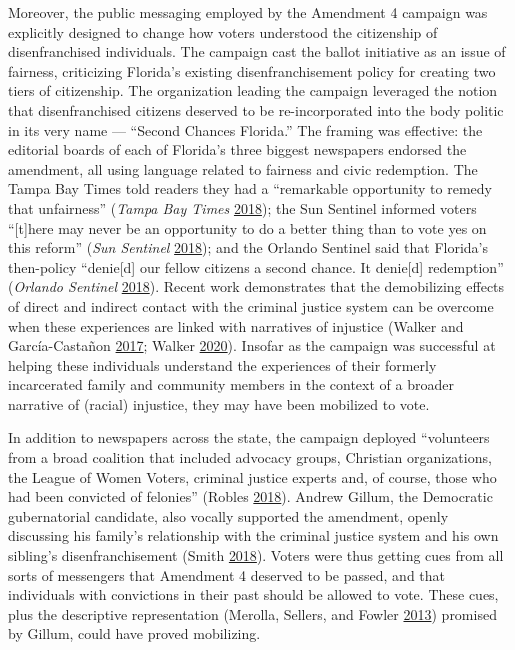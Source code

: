 \documentclass[
  12pt,
]{article}
\begin{document}
Moreover, the public messaging employed by the Amendment 4 campaign was explicitly designed to change how voters understood the citizenship of disenfranchised individuals. The campaign cast the ballot initiative as an issue of fairness, criticizing Florida's existing disenfranchisement policy for creating two tiers of citizenship. The organization leading the campaign leveraged the notion that disenfranchised citizens deserved to be re-incorporated into the body politic in its very name --- ``Second Chances Florida.'' The framing was effective: the editorial boards of each of Florida's three biggest newspapers endorsed the amendment, all using language related to fairness and civic redemption. The Tampa Bay Times told readers they had a ``remarkable opportunity to remedy that unfairness'' (\emph{Tampa Bay Times} \protect\hyperlink{ref-tampabaytimes2018}{2018}); the Sun Sentinel informed voters ``{[}t{]}here may never be an opportunity to do a better thing than to vote yes on this reform'' (\emph{Sun Sentinel} \protect\hyperlink{ref-SunSentinelEditorial2018}{2018}); and the Orlando Sentinel said that Florida's then-policy ``denie{[}d{]} our fellow citizens a second chance. It denie{[}d{]} redemption'' (\emph{Orlando Sentinel} \protect\hyperlink{ref-ORLANDOSENTINEL2018}{2018}). Recent work demonstrates that the demobilizing effects of direct and indirect contact with the criminal justice system can be overcome when these experiences are linked with narratives of injustice (Walker and García-Castañon \protect\hyperlink{ref-Walker2017}{2017}; Walker \protect\hyperlink{ref-Walker2020}{2020}). Insofar as the campaign was successful at helping these individuals understand the experiences of their formerly incarcerated family and community members in the context of a broader narrative of (racial) injustice, they may have been mobilized to vote.

In addition to newspapers across the state, the campaign deployed ``volunteers from a broad coalition that included advocacy groups, Christian organizations, the League of Women Voters, criminal justice experts and, of course, those who had been convicted of felonies'' (Robles \protect\hyperlink{ref-Robles2018}{2018}). Andrew Gillum, the Democratic gubernatorial candidate, also vocally supported the amendment, openly discussing his family's relationship with the criminal justice system and his own sibling's disenfranchisement (Smith \protect\hyperlink{ref-Smith2018}{2018}). Voters were thus getting cues from all sorts of messengers that Amendment 4 deserved to be passed, and that individuals with convictions in their past should be allowed to vote. These cues, plus the descriptive representation (Merolla, Sellers, and Fowler \protect\hyperlink{ref-Merolla2013}{2013}) promised by Gillum, could have proved mobilizing.
\end{document}
